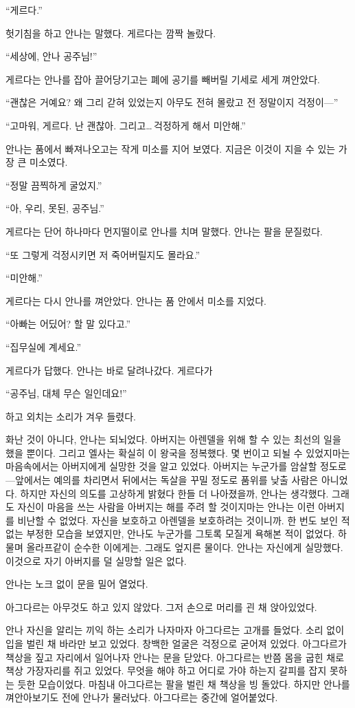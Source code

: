 ``게르다.''

헛기침을 하고 안나는 말했다. 게르다는 깜짝 놀랐다.

``세상에, 안나 공주님!''

게르다는 안나를 잡아 끌어당기고는 폐에 공기를 빼버릴 기세로 세게 껴안았다.

``괜찮은 거예요? 왜 그리 갇혀 있었는지 아무도 전혀 몰랐고 전 정말이지 걱정이—''

``고마워, 게르다. 난 괜찮아. 그리고\ldots\,걱정하게 해서 미안해.''

안나는 품에서 빠져나오고는 작게 미소를 지어 보였다. 지금은 이것이 지을 수 있는 가장 큰 미소였다.

``정말 끔찍하게 굴었지.''

``아, 우리, 못된, 공주님.''

게르다는 단어 하나마다 먼지떨이로 안나를 치며 말했다. 안나는 팔을 문질렀다.

``또 그렇게 걱정시키면 저 죽어버릴지도 몰라요.''

``미안해.''

게르다는 다시 안나를 껴안았다. 안나는 품 안에서 미소를 지었다.

``아빠는 어딨어? 할 말 있다고.''

``집무실에 계세요.''

게르다가 답했다. 안나는 바로 달려나갔다. 게르다가

``공주님, 대체 무슨 일인데요!''

하고 외치는 소리가 겨우 들렸다.

화난 것이 아니다, 안나는 되뇌었다. 아버지는 아렌델을 위해 할 수 있는 최선의 일을 했을 뿐이다. 그리고 엘사는 확실히 이 왕국을 정복했다. 몇 번이고 되뇔 수 있었지마는 마음속에서는 아버지에게 실망한 것을 알고 있었다. 아버지는 누군가를 암살할 정도로—앞에서는 예의를 차리면서 뒤에서는 독살을 꾸밀 정도로 품위를 낮출 사람은 아니었다. 하지만 자신의 의도를 고상하게 밝혔다 한들 더 나아졌을까, 안나는 생각했다. 그래도 자신이 마음을 쓰는 사람을 아버지는 해를 주려 할 것이지마는 안나는 이런 아버지를 비난할 수 없었다. 자신을 보호하고 아렌델을 보호하려는 것이니까. 한 번도 보인 적 없는 부정한 모습을 보였지만, 안나도 누군가를 그토록 모질게 욕해본 적이 없었다. 하물며 올라프같이 순수한 이에게는. 그래도 엎지른 물이다. 안나는 자신에게 실망했다. 이것으로 자기 아버지를 덜 실망할 일은 없다.

안나는 노크 없이 문을 밀어 열었다.

아그다르는 아무것도 하고 있지 않았다. 그저 손으로 머리를 괸 채 앉아있었다.

안나 자신을 알리는 끼익 하는 소리가 나자마자 아그다르는 고개를 들었다. 소리 없이 입을 벌린 채 바라만 보고 있었다. 창백한 얼굴은 걱정으로 굳어져 있었다. 아그다르가 책상을 짚고 자리에서 일어나자 안나는 문을 닫았다. 아그다르는 반쯤 몸을 굽힌 채로 책상 가장자리를 쥐고 있었다. 무엇을 해야 하고 어디로 가야 하는지 갈피를 잡지 못하는 듯한 모습이었다. 마침내 아그다르는 팔을 벌린 채 책상을 빙 돌았다. 하지만 안나를 껴안아보기도 전에 안나가 물러났다. 아그다르는 중간에 얼어붙었다.

